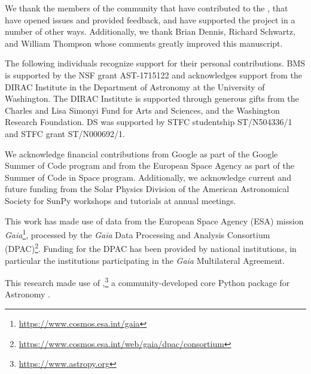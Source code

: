 \acknowledgments

We thank the members of the community that have contributed to the \sunpyproj, that have opened issues and provided feedback, and have supported the project in a number of other ways.
Additionally, we thank Brian Dennis, Richard Schwartz, and William Thompson whose comments greatly improved this manuscript.

The following individuals recognize support for their personal contributions.
BMS is supported by the NSF grant AST-1715122 and acknowledges support from the DIRAC Institute in the Department of Astronomy at the University of Washington.
The DIRAC Institute is supported through generous gifts from the Charles and Lisa Simonyi Fund for Arts and Sciences, and the Washington Research Foundation.
DS was supported by STFC studentship ST/N504336/1 and STFC grant ST/N000692/1.

We acknowledge financial contributions from Google as part of the Google Summer of Code program and from the European Space Agency as part of the Summer of Code in Space program.
Additionally, we acknowledge current and future funding from the Solar Physics Division of the American Astronomical Society for SunPy workshops and tutorials at annual meetings.

This work has made use of data from the European Space Agency (ESA) mission \textit{Gaia}\footnote{\url{https://www.cosmos.esa.int/gaia}}, processed by the \textit{Gaia} Data Processing and Analysis Consortium (DPAC)\footnote{\url{https://www.cosmos.esa.int/web/gaia/dpac/consortium}}.
Funding for the DPAC has been provided by national institutions, in particular the institutions participating in the {\it Gaia} Multilateral Agreement.

This research made use of \astropypkg,\footnote{\url{https://www.astropy.org}} a community-developed core Python package for Astronomy \citep{astropy2013, astropy2018}.

